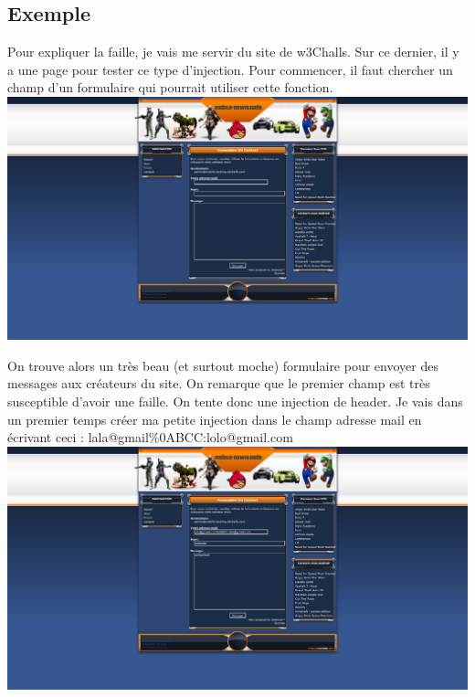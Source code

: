 \documentclass{article}
\begin{document}
\subsection{Exemple}

Pour expliquer la faille, je vais me servir du site de w3Challs. Sur ce dernier, il y a une page pour tester ce type d'injection. Pour commencer, il faut chercher un champ d'un formulaire qui pourrait utiliser cette fonction.
\vspace{0.2cm}\\
\includegraphics[width=\textwidth]{8}\\
\vspace{0.2cm}

On trouve alors un très beau (et surtout moche) formulaire pour envoyer des messages aux créateurs du site. On remarque que le premier champ est très susceptible d'avoir une faille. On tente donc une injection de header. Je vais dans un premier temps créer ma petite injection dans le champ adresse mail en écrivant ceci : lala@gmail\%0ABCC:lolo@gmail.com
\vspace{0.2cm}\\
\includegraphics[width=\textwidth]{9}\\
\vspace{0.2cm}
\end{document}

